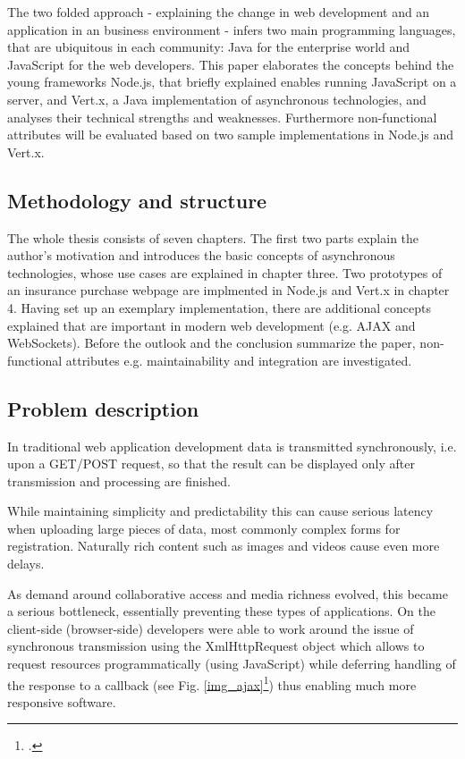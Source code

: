 The two folded approach - explaining the change in web development and an application in an 
business environment - infers two main programming languages, that are ubiquitous in each
community: Java for the enterprise world and JavaScript for the web developers.
This paper elaborates the concepts behind the young frameworks Node.js, that briefly explained enables running JavaScript on a server, and 
Vert.x, a Java implementation of asynchronous technologies, and analyses their 
technical strengths and weaknesses. Furthermore non-functional attributes will be
evaluated based on two sample implementations in Node.js  and Vert.x.

\subsection{Methodology and structure}
The whole thesis consists of seven chapters. The first two parts explain the author's motivation and introduces the 
basic concepts of asynchronous technologies, whose use cases are explained in chapter three.
Two prototypes of an insurance purchase webpage are implmented in Node.js and Vert.x in chapter 4.
Having set up an exemplary implementation, there are additional concepts explained that are important in modern web development (e.g. AJAX and WebSockets). Before the outlook and the conclusion summarize the paper, non-functional attributes e.g. maintainability and integration are 
investigated.

\subsection{Problem description}

In traditional web application development data is transmitted synchronously,
i.e. upon a GET/POST request, so that the result can be displayed only after transmission
and processing are finished.

While maintaining simplicity and
predictability this can cause serious latency when uploading large pieces of
data, most commonly complex forms for registration. Naturally rich content such
as images and videos cause even more delays.

As demand around collaborative access and media richness evolved, this became a
serious bottleneck, essentially preventing these types of applications. On the
client-side (browser-side) developers were able to work around the issue of
synchronous transmission using the XmlHttpRequest object which allows to request
resources programmatically (using JavaScript) while
deferring handling of the response to a callback (see Fig. \ref{img_ajax}\footcite{img_ajax}) thus enabling much more responsive software.


